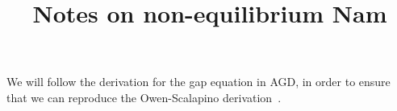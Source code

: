 \documentclass{article}
\title{Notes on non-equilibrium Nam}
\begin{document}
\maketitle

We will follow the derivation for the gap equation in AGD, in order to ensure that we can reproduce the Owen-Scalapino derivation~\cite{OwenScalapino}.

\printbibliography
\end{document}
